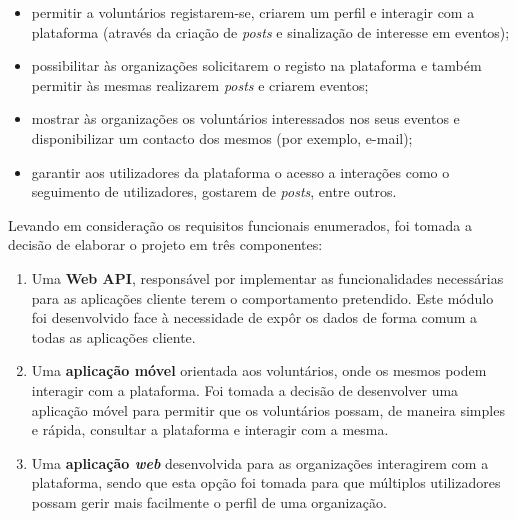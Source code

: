\begin{itemize}
	\item permitir a voluntários registarem-se, criarem um perfil e interagir com a plataforma (através da criação de \textit{posts} e sinalização de interesse em eventos);
	\item possibilitar às organizações solicitarem o registo na plataforma e também permitir às mesmas realizarem \textit{posts} e criarem eventos;
	\item mostrar às organizações os voluntários interessados nos seus eventos e disponibilizar um contacto dos mesmos (por exemplo, e-mail);
	\item garantir aos utilizadores da plataforma o acesso a interações como o seguimento de utilizadores, gostarem de \textit{posts}, entre outros.
\end{itemize}

Levando em consideração os requisitos funcionais enumerados, foi tomada a decisão de elaborar o projeto em três componentes: 
\begin{enumerate}
	\item Uma \textbf{Web API}, responsável por implementar as funcionalidades necessárias para as aplicações cliente terem o comportamento pretendido. Este módulo foi desenvolvido face à necessidade de expôr os dados de forma comum a todas as aplicações cliente.
	\item Uma \textbf{aplicação móvel} orientada aos voluntários, onde os mesmos podem interagir com a plataforma. Foi tomada a decisão de desenvolver uma aplicação móvel para permitir que os voluntários possam, de maneira simples e rápida, consultar a plataforma e interagir com a mesma.
	\item Uma \textbf{aplicação \textit{web}} desenvolvida para as organizações interagirem com a plataforma, sendo que esta opção foi tomada para que múltiplos utilizadores possam gerir mais facilmente o perfil de uma organização.
\end{enumerate}